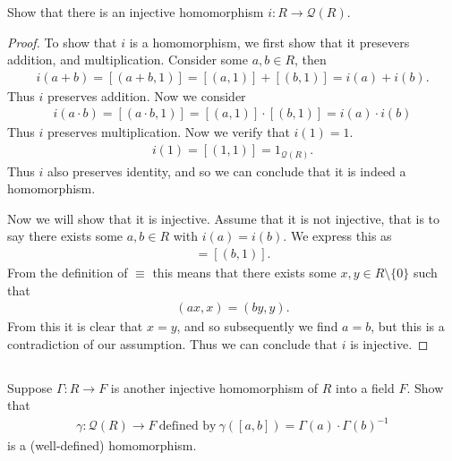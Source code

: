 \documentclass[10pt]{amsart}
\newcommand{\ra}{\rightarrow}
\newenvironment{claim}[1]{\par\noindent\textit{Claim:}\space#1}{}
\begin{document}
Show that there is an injective homomorphism $i:R\ra\mathcal{Q}(R)$.

\begin{proof}
  To show that $i$ is a homomorphism, we first show that it presevers addition,
  and multiplication. Consider some $a,b\in R$, then
  \begin{align*}
    i(a+b)=[(a+b,1)]=[(a,1)]+[(b,1)]=i(a)+i(b).
  \end{align*}
  Thus $i$ preserves addition. Now we consider
  \begin{align*}
    i(a\cdot b)=[(a\cdot b,1)]=[(a,1)]\cdot[(b,1)]=i(a)\cdot i(b)
  \end{align*}
  Thus $i$ preserves multiplication. Now we verify that $i(1)=1$.
  \begin{align*}
    i(1)=[(1,1)]=1_{\mathcal{Q}(R)}.
  \end{align*}
  Thus $i$ also preserves identity, and so we can conclude that it is indeed a
  homomorphism.

  Now we will show that it is injective. Assume that it is not injective, that
  is to say there exists some $a,b\in R$ with $i(a)=i(b)$. We express this as
  \begin{align*}
    [(a,1)]=[(b,1)].
  \end{align*}
  From the definition of $\equiv$ this means that there exists some $x,y\in
  R\setminus\{0\}$ such that
  \begin{align*}
    (ax,x)=(by,y).
  \end{align*}
  From this it is clear that $x=y$, and so subsequently we find $a=b$, but this
  is a contradiction of our assumption. Thus we can conclude that $i$ is
  injective.
\end{proof}

\subsection{}%
\label{sub:2b}

Suppose $\Gamma:R\ra F$ is another injective homomorphism of $R$ into a field
$F$. Show that
\begin{align*}
  \gamma:\mathcal{Q}(R)\ra F\ \text{defined by}\
  \gamma([a,b])=\Gamma(a)\cdot {\Gamma(b)}^{-1}
\end{align*}
is a (well-defined) homomorphism.
\end{document}
